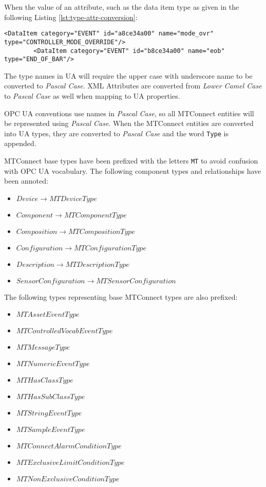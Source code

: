 When the value of an attribute, such as the data item type as given in the following Listing \ref{lst:type-attr-conversion}:

\begin{lstlisting}[firstnumber=1,%
    caption={\texttt{DataItem} \texttt{type} Attribtue Conversion}, label={lst:type-attr-conversion}]
        <DataItem category="EVENT" id="a8ce34a00" name="mode_ovr" type="CONTROLLER_MODE_OVERRIDE"/>
        <DataItem category="EVENT" id="b8ce34a00" name="eob" type="END_OF_BAR"/>
\end{lstlisting}

The type names in UA will require the upper case with underscore name to be converted to \textit{Pascal Case}. XML Attributes are converted from \textit{Lower Camel Case} to \textit{Pascal Case} as well when mapping to UA properties.

OPC UA conventions use names in \textit{Pascal Case}, so all MTConnect entities will be represented using \textit{Pascal Case}. When the MTConnect entities are converted into UA types, they are converted to \textit{Pascal Case} and the word \texttt{Type} is appended. 

MTConnect base types have been prefixed with the letters \texttt{MT} to avoid confusion with OPC UA vocabulary. The following component types and relationships have been annoted:

\begin{itemize}
\item $Device \rightarrow MTDeviceType$
\item $Component \rightarrow MTComponentType$
\item $Composition \rightarrow MTCompositionType$
\item $Configuration \rightarrow MTConfigurationType$
\item $Description \rightarrow MTDescriptionType$
\item $SensorConfiguration \rightarrow MTSensorConfiguration$
\end{itemize}

The following types representing base MTConnect types are also prefixed:

\begin{itemize}
\item $MTAssetEventType$
\item $MTControlledVocabEventType$
\item $MTMessageType$
\item $MTNumericEventType$
\item $MTHasClassType$
\item $MTHasSubClassType$
\item $MTStringEventType$
\item $MTSampleEventType$
\item $MTConnectAlarmConditionType$
\item $MTExclusiveLimitConditionType$
\item $MTNonExclusiveConditionType$
\end{itemize}

